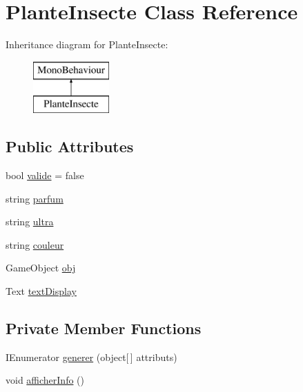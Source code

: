 \hypertarget{class_plante_insecte}{}\section{Plante\+Insecte Class Reference}
\label{class_plante_insecte}
Inheritance diagram for Plante\+Insecte\+:\begin{figure}[H]
\begin{center}
\leavevmode
\includegraphics[height=2.000000cm]{class_plante_insecte}
\end{center}
\end{figure}
\subsection*{Public Attributes}
\begin{DoxyCompactItemize}
\item 
bool \mbox{\hyperlink{class_plante_insecte_a878195ddae623019386962c0bc59e9fa}{valide}} = false
\item 
string \mbox{\hyperlink{class_plante_insecte_ab0de41d3ee235eefb189fcc45def5f72}{parfum}}
\item 
string \mbox{\hyperlink{class_plante_insecte_a3f8b8029bf7af2a07d7b6121c4fcc46b}{ultra}}
\item 
string \mbox{\hyperlink{class_plante_insecte_a2a6a82e57f74cbe86c5bcd5ab34a5078}{couleur}}
\item 
Game\+Object \mbox{\hyperlink{class_plante_insecte_a30b84ff54026e3dffb8df37d2380b622}{obj}}
\item 
Text \mbox{\hyperlink{class_plante_insecte_aa914c21b885c3fa13ac6890f6ed7e84c}{text\+Display}}
\end{DoxyCompactItemize}
\subsection*{Private Member Functions}
\begin{DoxyCompactItemize}
\item 
I\+Enumerator \mbox{\hyperlink{class_plante_insecte_a9c634b8de63b9d9451af19fa7df2c5b4}{generer}} (object\mbox{[}$\,$\mbox{]} attributs)
\item 
void \mbox{\hyperlink{class_plante_insecte_aa9bdc4d5d44328a744969f5be851a5f5}{afficher\+Info}} ()
\end{DoxyCompactItemize}



